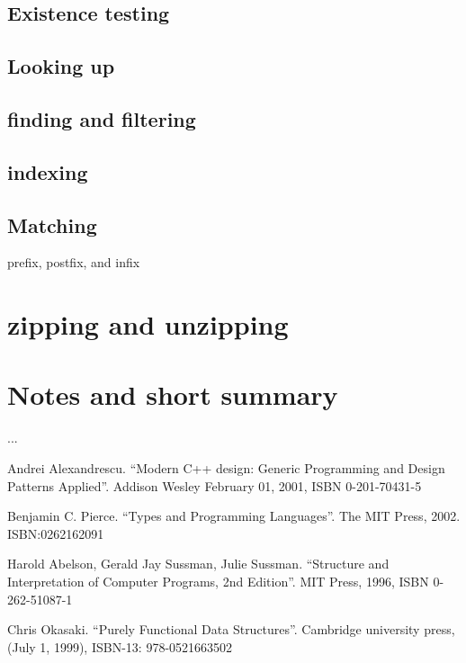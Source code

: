 \documentclass{article}
\begin{document}
\subsection{Existence testing}

\subsection{Looking up}

\subsection{finding and filtering}

\subsection{indexing}

\subsection{Matching}

prefix, postfix, and infix

\section{zipping and unzipping}

\section{Notes and short summary}
...


\begin{thebibliography}{99}

Andrei Alexandrescu. ``Modern C++ design: Generic Programming and Design Patterns Applied''. Addison Wesley February 01, 2001, ISBN 0-201-70431-5

Benjamin C. Pierce. ``Types and Programming Languages''. The MIT Press, 2002. ISBN:0262162091

Harold Abelson, Gerald Jay Sussman, Julie Sussman. ``Structure and Interpretation of Computer Programs, 2nd Edition''. MIT Press, 1996, ISBN 0-262-51087-1

Chris Okasaki. ``Purely Functional Data Structures''. Cambridge university press, (July 1, 1999), ISBN-13: 978-0521663502

\end{thebibliography}

\ifx\wholebook\relax \else
\end{document}
